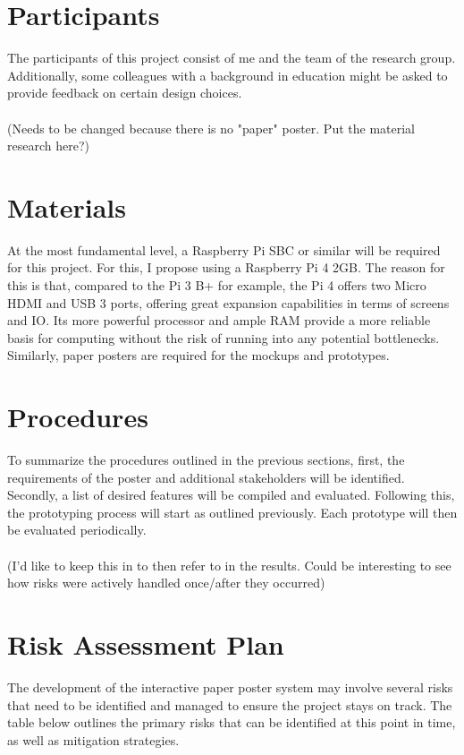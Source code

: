 \section{Participants}
The participants of this project consist of me and the team of the research group. Additionally, some colleagues with a background in education might be asked to provide feedback on certain design choices.\\\\

(Needs to be changed because there is no "paper" poster. Put the material research here?)

\section{Materials}
At the most fundamental level, a Raspberry Pi SBC or similar will be required for this project. For this, I propose using a Raspberry Pi 4 2GB. The reason for this is that, compared to the Pi 3 B+ for example, the Pi 4 offers two Micro HDMI and USB 3 ports, offering great expansion capabilities in terms of screens and IO. Its more powerful processor and ample RAM provide a more reliable basis for computing without the risk of running into any potential bottlenecks.
Similarly, paper posters are required for the mockups and prototypes.

\section{Procedures}
To summarize the procedures outlined in the previous sections, first, the requirements of the poster and additional stakeholders will be identified. Secondly, a list of desired features will be compiled and evaluated. Following this, the prototyping process will start as outlined previously. Each prototype will then be evaluated periodically.\\\\

(I'd like to keep this in to then refer to in the results. Could be interesting to see how risks were actively handled once/after they occurred)\\

\section{Risk Assessment Plan}

The development of the interactive paper poster system may involve several risks that need to be identified and managed to ensure the project stays on track. The table below outlines the primary risks that can be identified at this point in time, as well as mitigation strategies.

